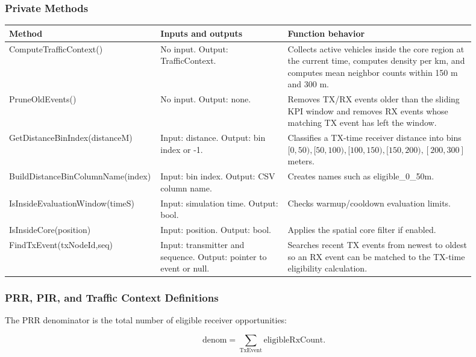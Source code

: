 \documentclass[11pt]{article}
\DeclareRobustCommand{\code}[1]{\texttt{\detokenize{#1}}}
\def\code#1{#1}%
\begin{document}
\subsubsection{Private Methods}

\begin{center}
\begin{longtable}{L{0.25\linewidth}L{0.27\linewidth}L{0.38\linewidth}}
\toprule
Method & Inputs and outputs & Function behavior \\
\midrule
\endhead
\code{ComputeTrafficContext()} &
No input.  Output: \code{TrafficContext}. &
Collects active vehicles inside the core region at the current time, computes
density per km, and computes mean neighbor counts within 150 m and 300 m. \\
\code{PruneOldEvents()} &
No input.  Output: none. &
Removes TX/RX events older than the sliding KPI window and removes RX events
whose matching TX event has left the window. \\
\code{GetDistanceBinIndex(distanceM)} &
Input: distance.  Output: bin index or \code{-1}. &
Classifies a TX-time receiver distance into bins
\([0,50), [50,100), [100,150), [150,200), [200,300]\) meters. \\
\code{BuildDistanceBinColumnName(index)} &
Input: bin index.  Output: CSV column name. &
Creates names such as \code{eligible_0_50m}. \\
\code{IsInsideEvaluationWindow(timeS)} &
Input: simulation time.  Output: bool. &
Checks warmup/cooldown evaluation limits. \\
\code{IsInsideCore(position)} &
Input: position.  Output: bool. &
Applies the spatial core filter if enabled. \\
\code{FindTxEvent(txNodeId,seq)} &
Input: transmitter and sequence.  Output: pointer to event or null. &
Searches recent TX events from newest to oldest so an RX event can be matched to
the TX-time eligibility calculation. \\
\bottomrule
\end{longtable}
\end{center}

\subsubsection{PRR, PIR, and Traffic Context Definitions}

The PRR denominator is the total number of eligible receiver opportunities:

\[
\mathrm{denom} = \sum_{\mathrm{TxEvent}} \mathrm{eligibleRxCount}.
\]
\end{document}
